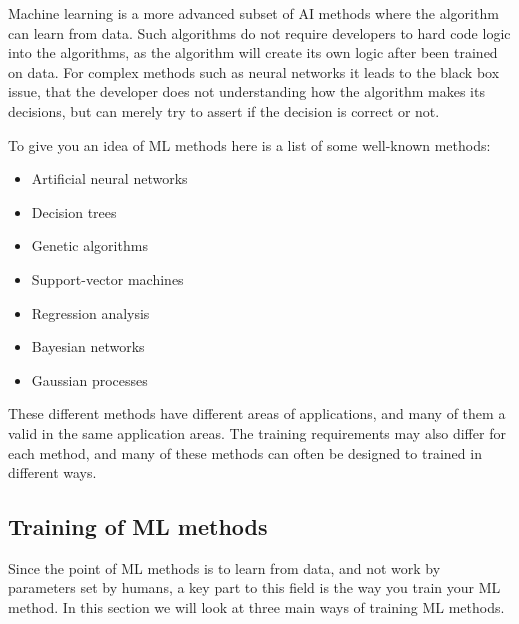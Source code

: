 \documentclass[12pt,a4paper]{article} %
\numberwithin{equation}{section}
\begin{document}
		Machine learning is a more advanced subset of AI methods where the algorithm can learn from data. Such algorithms do not require developers to hard code logic into the algorithms, as the algorithm will create its own logic after been trained on data. For complex methods such as neural networks it leads to the black box issue, that the developer does not understanding how the algorithm makes its decisions, but can merely try to assert if the decision is correct or not.
		
		To give you an idea of ML methods here is a list of some well-known methods:
		\begin{itemize}
			\item Artificial neural networks
			\item Decision trees
			\item Genetic algorithms
			\item Support-vector machines
			\item Regression analysis
			\item Bayesian networks
			\item Gaussian processes			
		\end{itemize}
		These different methods have different areas of applications, and many of them a valid in the same application areas. The training requirements may also differ for each method, and many of these methods can often be designed to trained in different ways.
	
	\subsection{Training of ML methods}
		Since the point of ML methods is to learn from data, and not work by parameters set by humans, a key part to this field is the way you train your ML method. In this section we will look at three main ways of training ML methods.
		
\end{document}

